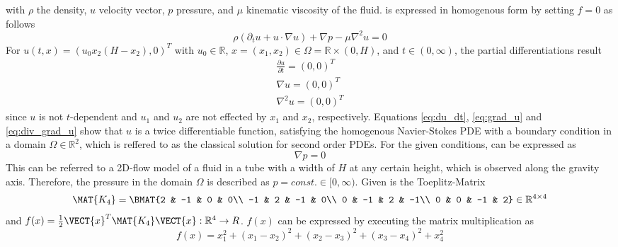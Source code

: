 with $\rho$ the density, $u$ velocity vector, $p$ pressure, and $\mu$ kinematic viscosity of the fluid.
 is expressed in homogenous form by setting $f = 0$ as follows
\begin{equation}
	\rho(\partial_t u + u \cdot \nabla u) + \nabla p - \mu \nabla ^2 u = 0
	\label{eq:NavStokesHom}
\end{equation}
For $u (t,x) = (u_0 x_2 (H - x_2), 0)^T$ with $u_0 \in \mathbb{R}$, $x = (x_ 1, x_2) \in \Omega = \mathbb{R} \times (0, H)$, and $t \in (0, \infty)$, the partial differentiations result
\begin{align}
	\frac{\partial u}{\partial t} = (0,0)^T \label{eq:du_dt}   \\
	\nabla u = (0,0)^T  					\label{eq:grad_u} \\
	\nabla^2 u = (0,0)^T  					\label{eq:div_grad_u}
\end{align}
%
since $u$ is not $t$-dependent and $u_1$ and $u_2$ are not effected by $x_1$ and $x_2$, respectively.
Equations \ref{eq:du_dt}, \ref{eq:grad_u} and \ref{eq:div_grad_u} show that $u$ is a twice differentiable function, satisfying the homogenous Navier-Stokes PDE with a boundary condition in a domain $\Omega \in \mathbb{R}^2$, which is reffered to as the classical solution for second order PDEs.
%
For the given conditions,  can be expressed as
\begin{equation}
	\nabla p = 0
\end{equation}
This can be referred to a 2D-flow model of a fluid in a tube with a width of $H$ at any certain height, which is observed along the gravity axis. Therefore, the pressure in the domain $\Omega$ is described as $p = const. \in [0, \infty)$.
%
Given is the Toeplitz-Matrix
\begin{equation}
	\MAT{K_4} = \BMAT{2 & -1 & 0 & 0\\
				-1 & 2 & -1 & 0\\
				0 & -1 & 2 & -1\\
				0 & 0 & -1 & 2} \in \mathbb{R}^{4 \times 4}
\end{equation}
and $f(x) = \frac{1}{2} \VECT{x}^T \MAT{K_4} \VECT{x}: \mathbb{R}^4 \rightarrow R$.
%
$f(x)$ can be expressed by executing the matrix multiplication as
\begin{equation}
	f(x)= x_1^2 + (x_1 - x_2)^2 + (x_2 - x_3)^2 + (x_3 - x_4)^2 + x_4^2
	\label{eq:fx_detail}
\end{equation}
